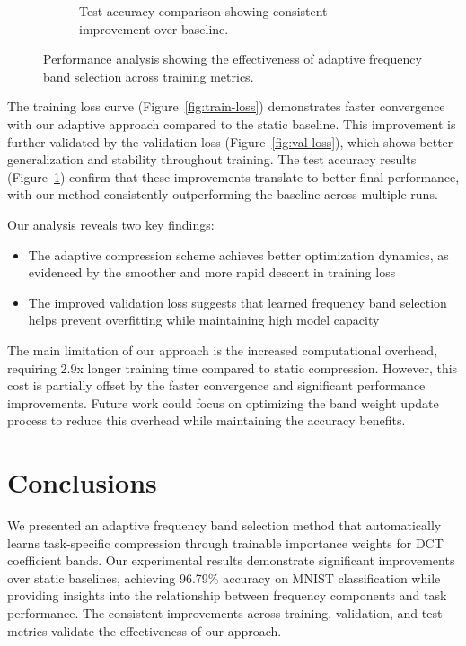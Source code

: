 \documentclass{article} %
\begin{document}
\begin{figure}[h]
\begin{subfigure}{0.32\textwidth}
        \caption{Test accuracy comparison showing consistent improvement over baseline.}
        \label{fig:test-acc}
    \end{subfigure}
    \caption{Performance analysis showing the effectiveness of adaptive frequency band selection across training metrics.}
    \label{fig:results}
\end{figure}

The training loss curve (Figure~\ref{fig:train-loss}) demonstrates faster convergence with our adaptive approach compared to the static baseline. This improvement is further validated by the validation loss (Figure~\ref{fig:val-loss}), which shows better generalization and stability throughout training. The test accuracy results (Figure~\ref{fig:test-acc}) confirm that these improvements translate to better final performance, with our method consistently outperforming the baseline across multiple runs.

Our analysis reveals two key findings:

\begin{itemize}
    \item The adaptive compression scheme achieves better optimization dynamics, as evidenced by the smoother and more rapid descent in training loss
    \item The improved validation loss suggests that learned frequency band selection helps prevent overfitting while maintaining high model capacity
\end{itemize}

The main limitation of our approach is the increased computational overhead, requiring 2.9x longer training time compared to static compression. However, this cost is partially offset by the faster convergence and significant performance improvements. Future work could focus on optimizing the band weight update process to reduce this overhead while maintaining the accuracy benefits.

\section{Conclusions}
\label{sec:conclusion}

We presented an adaptive frequency band selection method that automatically learns task-specific compression through trainable importance weights for DCT coefficient bands. Our experimental results demonstrate significant improvements over static baselines, achieving 96.79\% accuracy on MNIST classification while providing insights into the relationship between frequency components and task performance. The consistent improvements across training, validation, and test metrics validate the effectiveness of our approach.
\end{document}
